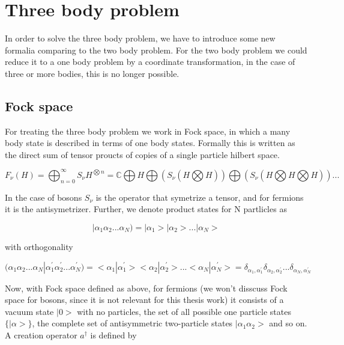 \documentclass[12pt,a4paper]{article}
\begin{document}
\section{Three body problem}
In order to solve the three body problem, we have to introduce some new formalia comparing to the two body problem. For the two body problem we could reduce it to a one body problem by a coordinate transformation, in the case of three or more bodies, this is no longer possible. 

\subsection{Fock space}
For treating the three body problem we work in Fock space, in which a many body state is described in terms of one body states. Formally this is written as the direct sum of tensor proucts of copies of a single particle hilbert space. 

\begin{equation}
F_{\nu}(H) =
\bigoplus_{n=0}^{\infty}S_{\nu}H^{\bigotimes n} =
\mathbb{C} \bigoplus H \bigoplus(S_{\nu}(H \bigotimes H)) \bigoplus (S_{\nu}(H \bigotimes H \bigotimes H)) ...
\end{equation}

In the case of bosons $S_{\nu}$ is the operator that symetrize a tensor, and for fermions it is the antisymetrizer.
Further, we denote product states for N partlicles as

\begin{equation}
|\alpha_1 \alpha_2 ... \alpha_{N}) =
|\alpha_1> |\alpha_2>...|\alpha_{N}>
\end{equation}

with orthogonality

\begin{equation}
(\alpha_1 \alpha_2 ... \alpha_N | \alpha_1^{'} \alpha_2^{'} ... \alpha_N^{'}) =
<\alpha_1| \alpha_1^{'}><\alpha_2|\alpha_2^{'}>...<\alpha_N| \alpha_N^{'}> = \delta_{\alpha_1,\alpha_1^{'}} \delta_{\alpha_2,\alpha_2^{'}}...\delta_{\alpha_N,\alpha_N^{'}}
\end{equation}

Now, with Fock space defined as above, for fermions (we won't disscuss Fock space for bosons, since it is not relevant for this thesis work) it consists of a vacuum state $|0>$ with no particles, the set of all possible one particle states $\{ |\alpha> \} $, the complete set of antisymmetric two-particle states $|\alpha_1 \alpha_2>$ and so on. A creation operator $a^{\dagger}$ is defined by
\end{document}
